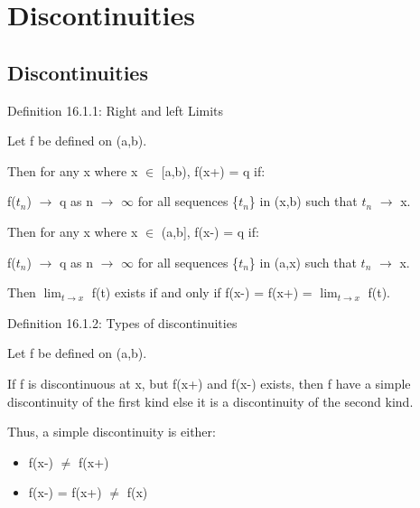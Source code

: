 \newpage

\section[Day 16: Discontinuities]{Discontinuities}

\subsection{ Discontinuities }

{ \color{blue} Definition 16.1.1: Right and left Limits }

    \begin{adjustbox}{minipage=14cm, right, vspace=0.1cm 0cm}
        Let f be defined on (a,b).
        
        \vspace{0.2cm}

        Then for any x where x $\in$ [a,b), f(x+) = q if:
        
        \hspace{1cm}
        f($t_n$) $\rightarrow$ q as n $\rightarrow$ $\infty$
        for all sequences \{$t_n$\} in (x,b) such that $t_n$ $\rightarrow$ x.

        \vspace{0.2cm}

        Then for any x where x $\in$ (a,b], f(x-) = q if:
        
        \hspace{1cm}
        f($t_n$) $\rightarrow$ q as n $\rightarrow$ $\infty$
        for all sequences \{$t_n$\} in (a,x) such that $t_n$ $\rightarrow$ x.

        \vspace{0.2cm}

        Then $\lim_{t \rightarrow x}$ f(t) exists if and only if
        f(x-) = f(x+) = $\lim_{t \rightarrow x}$ f(t).
    \end{adjustbox}

    \vspace{0.5cm}

{ \color{blue} Definition 16.1.2: Types of discontinuities }

    \begin{adjustbox}{minipage=14cm, right, vspace=0.1cm 0cm}
        Let f be defined on (a,b).

        If f is discontinuous at x, but f(x+) and f(x-) exists,
        then f have a simple discontinuity of the first kind else
        it is a discontinuity of the second kind.

        Thus, a simple discontinuity is either:

        \begin{itemize}[leftmargin=1cm, itemsep=0.1cm]
            \item f(x-) $\not = $ f(x+)
            
            \item f(x-) = f(x+) $\not =$ f(x) 
        \end{itemize}
    \end{adjustbox}





